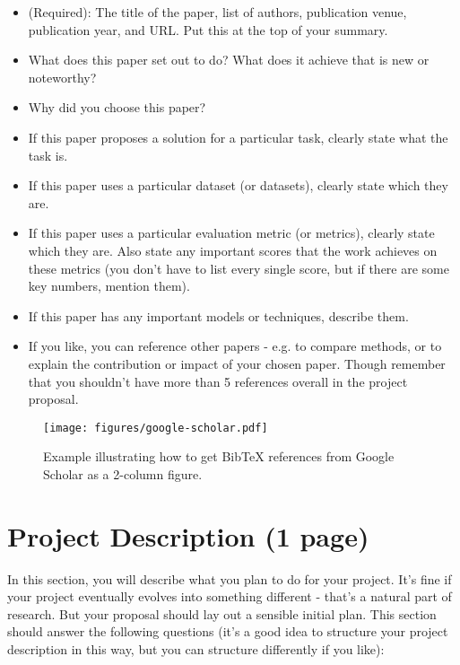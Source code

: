 \documentclass[10pt,twocolumn,letterpaper]{article}
\begin{document}
\begin{itemize}
\item (Required): The title of the paper, list of authors, publication venue, publication year, and URL. Put this at the top of your summary.
\item What does this paper set out to do? What does it achieve that is new or noteworthy?
\item Why did you choose this paper?
\item If this paper proposes a solution for a particular task, clearly state what the task is.
\item If this paper uses a particular dataset (or datasets), clearly state which they are.
\item If this paper uses a particular evaluation metric (or metrics), clearly state which they are. Also state any important scores that the work achieves on these metrics (you don't have to list every single score, but if there are some key numbers, mention them).
\item If this paper has any important models or techniques, describe them.
\item If you like, you can reference other papers - e.g. to compare methods, or to explain the contribution or impact of your chosen paper. Though remember that you shouldn't have more than 5 references overall in the project proposal.
\end{itemize}

\begin{figure*}
\begin{center}
   \texttt{[image: figures/google-scholar.pdf]}
\end{center}
   \caption{Example illustrating how to get BibTeX references from Google Scholar as a 2-column figure.}
\label{fig:google-scholar-2col}
\end{figure*}

\section{Project Description (1 page)}

In this section, you will describe what you plan to do for your project. It's fine if your project eventually evolves into something different - that's a natural part of research. But your proposal should lay out a sensible initial plan. This section should answer the following questions (it's a good idea to structure your project description in this way, but you can structure differently if you like):
\end{document}
